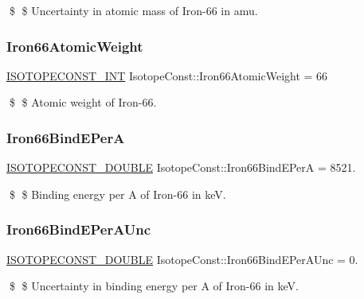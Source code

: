 \$ \$ Uncertainty in atomic mass of Iron-\/66 in amu. \mbox{\label{group___isotope_const-_iron-_fe66_gad8ed02476c5ea4601a3d2ca9a36e6cbc}} 
\subsubsection{\texorpdfstring{Iron66\+Atomic\+Weight}{Iron66AtomicWeight}}
{\footnotesize\ttfamily \mbox{\hyperlink{group___isotope_const-_macros_ga5f18360b3e99483a35c32d789e62621c}{I\+S\+O\+T\+O\+P\+E\+C\+O\+N\+S\+T\+\_\+\+I\+NT}} Isotope\+Const\+::\+Iron66\+Atomic\+Weight = 66}

\$ \$ Atomic weight of Iron-\/66. \mbox{\label{group___isotope_const-_iron-_fe66_gadbb56b26eca1076ef8cf1da0a5bfac20}} 
\subsubsection{\texorpdfstring{Iron66\+Bind\+E\+PerA}{Iron66BindEPerA}}
{\footnotesize\ttfamily \mbox{\hyperlink{group___isotope_const-_macros_ga8f45a7272ce02c0b4c65c44636ed719a}{I\+S\+O\+T\+O\+P\+E\+C\+O\+N\+S\+T\+\_\+\+D\+O\+U\+B\+LE}} Isotope\+Const\+::\+Iron66\+Bind\+E\+PerA = 8521.}

\$ \$ Binding energy per A of Iron-\/66 in keV. \mbox{\label{group___isotope_const-_iron-_fe66_ga5f041f67811c81f461240eddf880569a}} 
\subsubsection{\texorpdfstring{Iron66\+Bind\+E\+Per\+A\+Unc}{Iron66BindEPerAUnc}}
{\footnotesize\ttfamily \mbox{\hyperlink{group___isotope_const-_macros_ga8f45a7272ce02c0b4c65c44636ed719a}{I\+S\+O\+T\+O\+P\+E\+C\+O\+N\+S\+T\+\_\+\+D\+O\+U\+B\+LE}} Isotope\+Const\+::\+Iron66\+Bind\+E\+Per\+A\+Unc = 0.}

\$ \$ Uncertainty in binding energy per A of Iron-\/66 in keV. \mbox{\label{group___isotope_const-_iron-_fe66_gad9490beb8b81109e324099764637661d}} 
